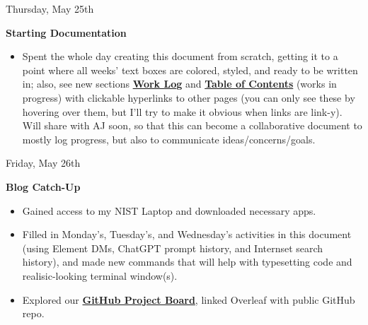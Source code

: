 \documentclass[11pt]{article}
\begin{document}
\begin{redbox}{Thursday, May 25th\vspace{-2.2em}\begin{flushright}\large\textbf{Starting Documentation} \end{flushright}}
    \begin{itemize}
        \item Spent the whole day creating this document from scratch, getting it to a point where all weeks' text boxes are colored, styled, and ready to be written in; also, see new sections \hyperlink{page.3}{\textbf{Work Log}} and \hyperlink{page.1}{\textbf{Table of Contents}} (works in progress) with clickable hyperlinks to other pages (you can only see these by hovering over them, but I'll try to make it obvious when links are link-y). Will share with AJ soon, so that this can become a collaborative document to mostly log progress, but also to communicate ideas/concerns/goals.
    \end{itemize}
\end{redbox}

\begin{center}
    \hspace{0.2cm}
    \vspace{-0.5em}
\end{center}

\begin{redbox}{Friday, May 26th\vspace{-2.2em}\begin{flushright}\large\textbf{Blog Catch-Up} \end{flushright}}
    \begin{itemize}
        \item Gained access to my NIST Laptop and downloaded necessary apps.
        \vspace{-0.65em}
        \item Filled in Monday's, Tuesday's, and Wednesday's activities in this document (using Element DMs, ChatGPT prompt history, and Internset search history), and made new commands that will help with typesetting code and realisic-looking terminal window(s). 
        \vspace{-2em}
        \item Explored our \href{https://github.com/users/aj-stein-nist/projects/2}{\textbf{GitHub Project Board}}, linked Overleaf with public GitHub repo.
    \end{itemize}
\end{redbox}
\end{document}
